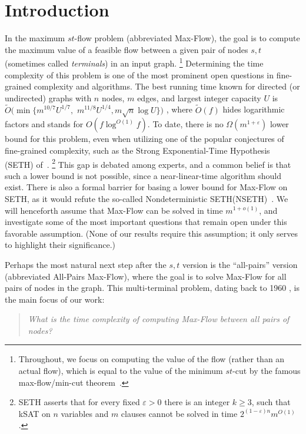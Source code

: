 \documentclass[11pt]{article}
\numberwithin{equation}{section}
\theoremstyle{definition}
\theoremstyle{plain}
\theoremstyle{plain}
\newcommand{\ProblemName}[1]{\textsf{#1}}
\newcommand{\MF}{\ProblemName{Max-Flow}\xspace}
\newcommand{\SETH}{SETH\xspace}
\newcommand{\NSETH}{NSETH\xspace}
\newcommand{\APMF}{\ProblemName{All-Pairs Max-Flow}\xspace}
\newcommand\eps{\varepsilon}
\newcommand\tO{\ensuremath{\widetilde O}}  %
\begin{document}
%
%
%

%
\section{Introduction}

In the maximum $st$-flow problem (abbreviated \MF),
the goal is to compute the maximum value of a feasible flow
%
between a given pair of nodes $s,t$ (sometimes called \emph{terminals})
in an input graph.%
\footnote{Throughout, we focus on computing the value of the flow
  (rather than an actual flow),
  which is equal to the value of the minimum $st$-cut
  by the famous max-flow/min-cut theorem~\cite{FF56}.
}
%
Determining the time complexity of this problem is one of the most prominent open questions in fine-grained complexity and algorithms.
The best running time known for directed (or undirected)
graphs with $n$ nodes, $m$ edges, and largest integer capacity $U$ is
$\tO(\min\{m^{10/7}U^{1/7},$ $m^{11/8} U^{1/4}, m \sqrt{n}\log U\})$ \cite{Madry16,LS19,lee2014path},
where %
%
%
$\tO(f)$ hides logarithmic factors
and stands for $O(f \log^{O(1)} f)$.
To date, there is no $\Omega(m^{1+\eps})$  lower bound for this problem,
even when utilizing one of the popular conjectures of fine-grained complexity,
such as the Strong Exponential-Time Hypothesis (\SETH) of~\cite{ImpaSETH}.%
\footnote{\SETH asserts that for every fixed $\varepsilon>0$
  there is an integer $k\geq 3$,
  such that kSAT on $n$ variables and $m$ clauses
  cannot be solved in time $2^{(1-\varepsilon)n} m^{O(1)}$.
}
This gap is
%
debated among experts,
and a common belief is that such a lower bound is not possible,
since a near-linear-time algorithm
%
%
should exist.  %
There is also a formal barrier for basing a lower bound for \MF on \SETH,
  as it would refute the so-called
%
%
Nondeterministic
\SETH (\NSETH)~\cite{carmosino2016nondeterministic}.
We will henceforth assume that \MF can be solved in time $m^{1+o(1)}$,
and investigate some of the most important questions that remain open under this favorable assumption.
(None of our results
%
require  %
this assumption; it only serves
%
%
%
%
to highlight their
%
significance.)

Perhaps the most natural
%
next step   %
after the $s,t$ version is the ``all-pairs'' version (abbreviated \APMF),
where the goal is to solve \MF for all pairs of nodes in the graph.
This multi-terminal problem, dating back to 1960 \cite{Mayeda60,Chien60},
is the main focus of our work:
\begin{quotation}
\emph{What is the time complexity of computing \MF between all pairs of nodes?}
\end{quotation}
\end{document}
